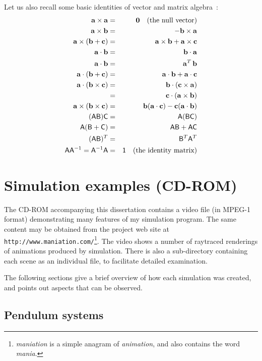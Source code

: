 Let us also recall some basic identities of vector and matrix algebra~\cite{RHB:02}:
\begin{eqnarray*}
\ve{a}\times\ve{a} & = & \ve{0}\quad\mathrm{(the~null~vector)} \\
\ve{a}\times\ve{b} & = & -\ve{b}\times\ve{a} \\
\ve{a}\times(\ve{b} + \ve{c}) & = & \ve{a}\times\ve{b} + \ve{a}\times\ve{c} \\
\ve{a}\cdot\ve{b} & = & \ve{b}\cdot\ve{a} \\
\ve{a}\cdot\ve{b} & = & \ve{a}^T\,\ve{b} \\
\ve{a}\cdot(\ve{b} + \ve{c}) & = & \ve{a}\cdot\ve{b} + \ve{a}\cdot\ve{c} \\
\ve{a}\cdot(\ve{b}\times\ve{c}) & = & \ve{b}\cdot(\ve{c}\times\ve{a}) \\
    & = & \ve{c}\cdot(\ve{a}\times\ve{b}) \\
\ve{a}\times(\ve{b}\times\ve{c}) & = &
    \ve{b}(\ve{a}\cdot\ve{c}) - \ve{c}(\ve{a}\cdot\ve{b}) \\
(\m{A}\m{B})\m{C} & = & \m{A}(\m{B}\m{C}) \\
\m{A}(\m{B} + \m{C}) & = & \m{A}\m{B} + \m{A}\m{C} \\
(\m{A}\m{B})^T & = & \m{B}^T\m{A}^T \\
\m{A}\m{A}^{-1} = \m{A}^{-1}\m{A} & = & \m{1}\quad\mathrm{(the~identity~matrix)}
\end{eqnarray*}


\chapter{Simulation examples (CD-ROM)\label{cdrom}}

The CD-ROM accompanying this dissertation contains a video file (in MPEG-1 format) demonstrating
many features of my simulation program. The same content may be obtained from the project web site
at \texttt{http://www.maniation.com/}\footnote{\emph{maniation} is a simple anagram of
\emph{animation}, and also contains the word \emph{mania}.}. The video shows a number of raytraced
renderings of animations produced by simulation. There is also a sub-directory containing each
scene as an individual file, to facilitate detailed examination.

The following sections give a brief overview of how each simulation was created, and points out
aspects that can be observed.

\section{Pendulum systems}

